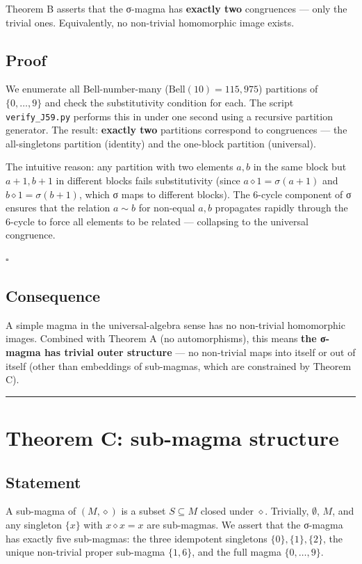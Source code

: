 \documentclass[11pt,reqno]{amsart}
\theoremstyle{plain}
\theoremstyle{definition}
\begin{document}
Theorem B asserts that the σ-magma has \textbf{exactly two} congruences --- only the trivial ones. Equivalently, no non-trivial homomorphic image exists.

\subsection{Proof}

We enumerate all Bell-number-many ($\mathrm{Bell}(10) = 115{,}975$) partitions of $\{0, \ldots, 9\}$ and check the substitutivity condition for each. The script \texttt{verify_J59.py} performs this in under one second using a recursive partition generator. The result: \textbf{exactly two} partitions correspond to congruences --- the all-singletons partition (identity) and the one-block partition (universal).

The intuitive reason: any partition with two elements $a, b$ in the same block but $a + 1, b + 1$ in different blocks fails substitutivity (since $a \diamond 1 = \sigma(a + 1)$ and $b \diamond 1 = \sigma(b + 1)$, which σ maps to different blocks). The 6-cycle component of σ ensures that the relation $a \sim b$ for non-equal $a, b$ propagates rapidly through the 6-cycle to force all elements to be related --- collapsing to the universal congruence.

$\square$

\subsection{Consequence}

A simple magma in the universal-algebra sense has no non-trivial homomorphic images. Combined with Theorem A (no automorphisms), this means \textbf{the σ-magma has trivial outer structure} --- no non-trivial maps into itself or out of itself (other than embeddings of sub-magmas, which are constrained by Theorem C).

\medskip\hrule\medskip

\section{Theorem C: sub-magma structure}

\subsection{Statement}

A sub-magma of $(M, \diamond)$ is a subset $S \subseteq M$ closed under $\diamond$. Trivially, $\emptyset$, $M$, and any singleton $\{x\}$ with $x \diamond x = x$ are sub-magmas. We assert that the σ-magma has exactly five sub-magmas: the three idempotent singletons $\{0\}, \{1\}, \{2\}$, the unique non-trivial proper sub-magma $\{1, 6\}$, and the full magma $\{0, \ldots, 9\}$.
\end{document}
